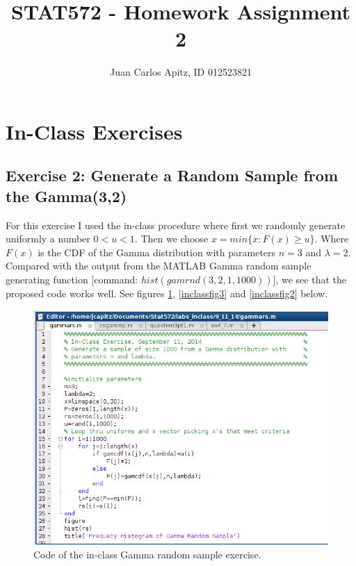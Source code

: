 \documentclass[12pt,a4paper]{article}
\author{Juan Carlos Apitz, ID 012523821}
\title{STAT572 - Homework Assignment 2}
\begin{document}
\maketitle

\section*{In-Class Exercises}

\subsection*{Exercise 2: Generate a Random Sample from the Gamma(3,2)}

For this exercise I used the in-class procedure where first we randomly generate uniformly a number $0<u<1$. Then we choose $ x=min\bigr\{x: F(x)\geq u\bigr\}$. Where $F(x)$ is the CDF of the Gamma distribution with parameters $n=3$ and $\lambda=2$. Compared with the output from the MATLAB Gamma random sample generating function [command: $hist(gamrnd(3,2,1,1000))]$, we see that the proposed code works well. See figures \ref{inclassfig1}, \ref{inclassfig3} and \ref{inclassfig2} below.


\begin{figure}[ht!]
\begin{center}
\includegraphics[scale=.60]{inClass_code.png}
\caption{Code of the in-class Gamma random sample exercise.}
\label{inclassfig1}
\end{center}
\end{figure}
\end{document}

